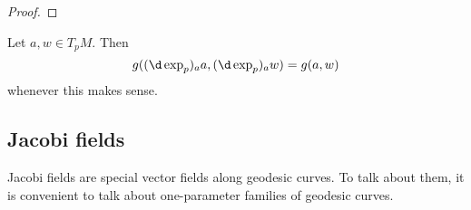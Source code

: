 \documentclass[a4paper]{article}
\begin{document}
\begin{proof}
%
%
%
%
\end{proof}

\begin{cor}
  Let $a, w \in T_p M$. Then
  \[
    g((\d \exp_p)_a a, (\d \exp_p)_a w) = g(a, w)
  \]
  whenever this makes sense.
\end{cor}

\subsection{Jacobi fields}
Jacobi fields are special vector fields along geodesic curves. To talk about them, it is convenient to talk about one-parameter families of geodesic curves.
\end{document}
